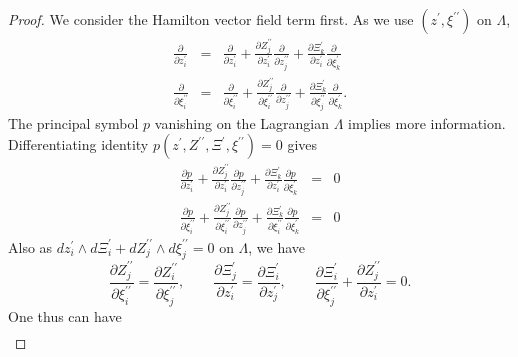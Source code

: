\documentclass[10pt, a4paper, twoside]{amsart}
\numberwithin{equation}{section}
\theoremstyle{remark}
\begin{document}
\begin{appendix}
\begin{proof}
	
	We consider the Hamilton vector field term first. As we use $(z^\prime, \xi^{\prime\prime})$ on $\Lambda$, \begin{eqnarray*}\frac{\partial}{\partial z^\prime_i} &=& \frac{\partial}{\partial z_i^\prime} + \frac{\partial Z_j^{\prime\prime}}{\partial z_i^{\prime}} \frac{\partial}{\partial z_j^{\prime\prime}} + \frac{\partial \Xi^\prime_k}{\partial z_i^\prime} \frac{\partial}{\partial \xi_k^\prime}  \\
	\frac{\partial}{\partial \xi^{\prime\prime}_i} &=& \frac{\partial}{\partial \xi_i^{\prime\prime}} + \frac{\partial Z_j^{\prime\prime}}{\partial \xi_i^{\prime\prime}} \frac{\partial}{\partial z_j^{\prime\prime}} + \frac{\partial \Xi^\prime_k}{\partial \xi_j^{\prime\prime}} \frac{\partial}{\partial \xi_k^\prime}.\end{eqnarray*} The principal symbol $p$ vanishing on the Lagrangian $\Lambda$ implies more information. Differentiating identity $p(z^\prime, Z^{\prime\prime}, \Xi^\prime, \xi^{\prime\prime}) = 0$ gives \begin{eqnarray*}\frac{\partial p}{\partial z_i^\prime} + \frac{\partial Z_j^{\prime\prime}}{\partial z_i^\prime} \frac{\partial p}{\partial z_j^{\prime\prime}} + \frac{\partial \Xi^\prime_k}{\partial z_i^\prime} \frac{\partial p}{\partial \xi_k^\prime} &=& 0 \\ \frac{\partial p}{\partial \xi_i^{\prime\prime}} + \frac{\partial Z_j^{\prime\prime}}{\partial \xi_i^{\prime\prime}} \frac{\partial p}{\partial z_j^{\prime\prime}} + \frac{\partial \Xi^{\prime}_k}{\partial \xi_i^{\prime\prime}} \frac{\partial p}{\partial \xi_k^\prime} &=& 0 
	\end{eqnarray*} 
	Also as $dz^\prime_i \wedge d\Xi^\prime_i + dZ_j^{\prime\prime} \wedge d\xi_j^{\prime\prime} = 0$ on $\Lambda$, we have 
	\begin{equation}
	\frac{\partial Z^{\prime\prime}_j}{\partial \xi^{\prime\prime}_i}  =  \frac{\partial Z^{\prime\prime}_i}{\partial \xi^{\prime\prime}_j}, \quad\quad  \frac{\partial \Xi^\prime_j}{\partial z^{\prime}_i} = \frac{\partial \Xi^\prime_i}{\partial z^{\prime}_j},   \quad\quad   \frac{\partial \Xi_i^\prime}{\partial \xi_j^{\prime\prime}} + \frac{\partial Z_j^{\prime\prime}}{\partial z_i^\prime} = 0.
	\label{bbbb}\end{equation}
	 One thus can have \begin{eqnarray*}

\end{eqnarray*}
\end{proof}
\end{appendix}
\end{document}
